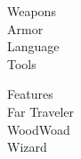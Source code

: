 \documentclass[a4paper,10pt,bg=full]{dndbook} %
\def\CharaClass{Wizard}
\def\Background{Far Traveler}
\def\Race{WoodWoad}
\begin{document}
	\begin{minipage}[t]{.25\linewidth}\Fontauri\normalsize
		\textcolor{titlered}{\large Weapons}\\
		
		\textcolor{titlered}{\large Armor}\\
		
		\textcolor{titlered}{\large Language}\\
		
		\textcolor{titlered}{\large Tools}\\
	\end{minipage}%
	\begin{minipage}[t]{.5\linewidth}\raggedleft \Fontauri\normalsize
		{\huge Features}\\
		\textcolor{titlered}{\large \Background}\\
		
		\textcolor{titlered}{\large \Race}\\
		
		\textcolor{titlered}{\large \CharaClass}\\
	\end{minipage} %
	
\end{document}
